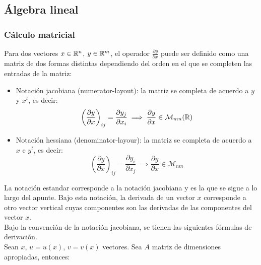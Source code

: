 \subsection{Álgebra lineal}

\subsubsection{Cálculo matricial}

Para dos vectores $x\in{\mathbb R}^n$, $y\in{\mathbb R}^m$, el operador $\frac{\partial y}{\partial x}$ puede ser definido como una matriz de dos formas distintas dependiendo del orden en el que se completen las entradas de la matriz:

\begin{itemize}
	\item Notación jacobiana (numerator-layout): la matriz se completa de acuerdo a $y$ y $x^t$, es decir:
	\begin{equation*}
		\left(\frac{\partial y}{\partial x}\right)_{ij} = \frac{\partial y_j}{\partial x_i} \implies \frac{\partial y}{\partial x}\in \mathcal{M}_{mn}({\mathbb R})
	\end{equation*}
	
	\item Notación hessiana (denominator-layour): la matriz se completa de acuerdo a $x$ e $y^t$, es decir:
	\begin{equation*}
		\left(\frac{\partial y}{\partial x}\right)_{ij} = \frac{\partial y_i}{\partial x_j} \implies \frac{\partial y}{\partial x}\in \mathcal{M}_{nm}
	\end{equation*}
	
\end{itemize}


La notación estandar corresponde a la notación jacobiana y es la que se sigue a lo largo del apunte. Bajo esta notación, la derivada de un vector $x$ corresponde a otro vector vertical cuyas componentes son las derivadas de las componentes del vector $x$.\\

Bajo la convención de la notación jacobiana, se tienen las siguientes fórmulas de derivación.\\

Sean $x$, $u=u(x)$, $v=v(x)$ vectores. Sea $A$ matriz de dimensiones apropiadas, entonces:

